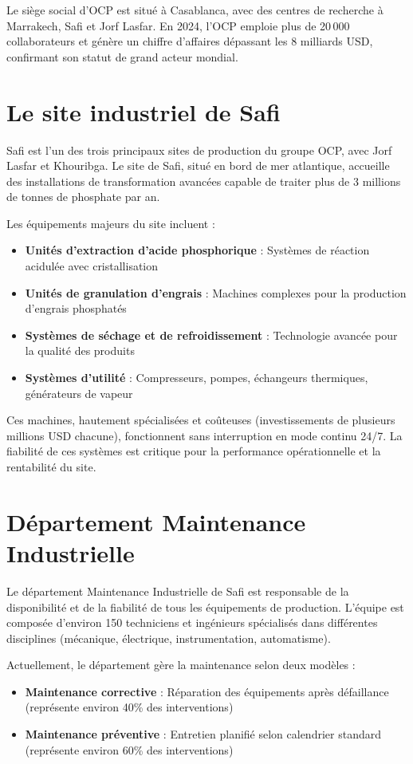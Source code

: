 \documentclass[a4paper,12pt,twoside]{report}
\begin{document}
Le siège social d'OCP est situé à Casablanca, avec des centres de recherche à Marrakech, Safi et Jorf Lasfar. En 2024, l'OCP emploie plus de 20\,000 collaborateurs et génère un chiffre d'affaires dépassant les 8 milliards USD, confirmant son statut de grand acteur mondial.

\section{Le site industriel de Safi}

Safi est l'un des trois principaux sites de production du groupe OCP, avec Jorf Lasfar et Khouribga. Le site de Safi, situé en bord de mer atlantique, accueille des installations de transformation avancées capable de traiter plus de 3 millions de tonnes de phosphate par an.

Les équipements majeurs du site incluent :
\begin{itemize}
    \item \textbf{Unités d'extraction d'acide phosphorique} : Systèmes de réaction acidulée avec cristallisation
    \item \textbf{Unités de granulation d'engrais} : Machines complexes pour la production d'engrais phosphatés
    \item \textbf{Systèmes de séchage et de refroidissement} : Technologie avancée pour la qualité des produits
    \item \textbf{Systèmes d'utilité} : Compresseurs, pompes, échangeurs thermiques, générateurs de vapeur
\end{itemize}

Ces machines, hautement spécialisées et coûteuses (investissements de plusieurs millions USD chacune), fonctionnent sans interruption en mode continu 24/7. La fiabilité de ces systèmes est critique pour la performance opérationnelle et la rentabilité du site.

\section{Département Maintenance Industrielle}

Le département Maintenance Industrielle de Safi est responsable de la disponibilité et de la fiabilité de tous les équipements de production. L'équipe est composée d'environ 150 techniciens et ingénieurs spécialisés dans différentes disciplines (mécanique, électrique, instrumentation, automatisme).

Actuellement, le département gère la maintenance selon deux modèles :
\begin{itemize}
    \item \textbf{Maintenance corrective} : Réparation des équipements après défaillance (représente environ 40\% des interventions)
    \item \textbf{Maintenance préventive} : Entretien planifié selon calendrier standard (représente environ 60\% des interventions)
\end{itemize}
\end{document}

